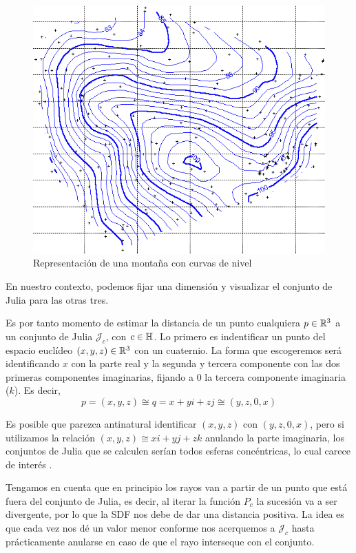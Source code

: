 \begin{figure} [ht]
    \centering
    \includegraphics[scale = 0.3]{img/C8/curvas-de-nivel2.png}
    \caption{Representación de una montaña con curvas de nivel}
    \label{fig:curva-de-nivel}
\end{figure}

En nuestro contexto, podemos fijar una dimensión y visualizar el conjunto de Julia para las otras tres. 

Es por tanto momento de estimar la distancia de un punto cualquiera $p\in\mathbb{R}^3$ a un conjunto de Julia $\mathcal{J}_c$, con $c\in\mathbb{H}$. Lo primero es indentificar un punto del espacio euclídeo $(x,y,z)\in\mathbb{R}^3$ con un cuaternio. La forma que escogeremos será identificando $x$ con la parte real y la segunda y tercera componente con las dos primeras componentes imaginarias, fijando a $0$ la tercera componente imaginaria ($k$). Es decir,
\begin{equation}
    p=(x,y,z)\cong q = x + yi + zj \cong (y,z,0,x)
\end{equation}

Es posible que parezca antinatural identificar $(x,y,z)$ con $(y,z,0,x)$, pero si utilizamos la relación $(x,y,z)\cong xi+yj+zk$ anulando la parte imaginaria, los conjuntos de Julia que se calculen serían todos esferas concéntricas, lo cual carece de interés \cite{Hart-1989}.

Tengamos en cuenta que en principio los rayos van a partir de un punto que está fuera del conjunto de Julia, es decir, al iterar la función $P_c$ la sucesión va a ser divergente, por lo que la SDF nos debe de dar una distancia positiva. La idea es que cada vez nos dé un valor menor conforme nos acerquemos a $\mathcal{J}_c$ hasta prácticamente anularse en caso de que el rayo interseque con el conjunto. 

